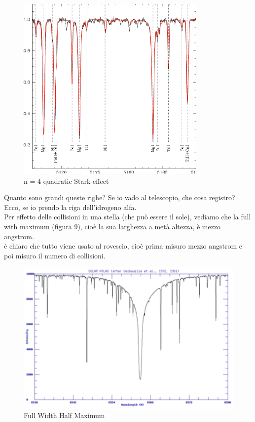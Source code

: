 \documentclass[a4paper,11pt]{article}
\begin{document}
\begin{figure}
	\centering
	\includegraphics[width=0.5\linewidth]{graficorossonero}
	\caption[Figura 1]{	n = 4 quadratic Stark effect}
	\label{fig:graficorossonero}
\end{figure}


Quanto sono grandi queste righe? Se io vado al telescopio, che cosa registro? Ecco, se io prendo la riga dell'idrogeno alfa. \\Per effetto delle collisioni in una stella (che può essere il sole), vediamo che la full with maximum (figura 9), cioè la sua larghezza a metà altezza, è mezzo angstrom. \\è chiaro che tutto viene usato al rovescio, cioè prima misuro mezzo angstrom e poi misuro il numero di collisioni. 


\begin{figure}
	\centering
	\includegraphics[width=0.5\linewidth]{linearstark}
	\caption[Figura 1]{	Full Width Half Maximum}
	\label{fig:linearstark}
\end{figure}
\end{document}

